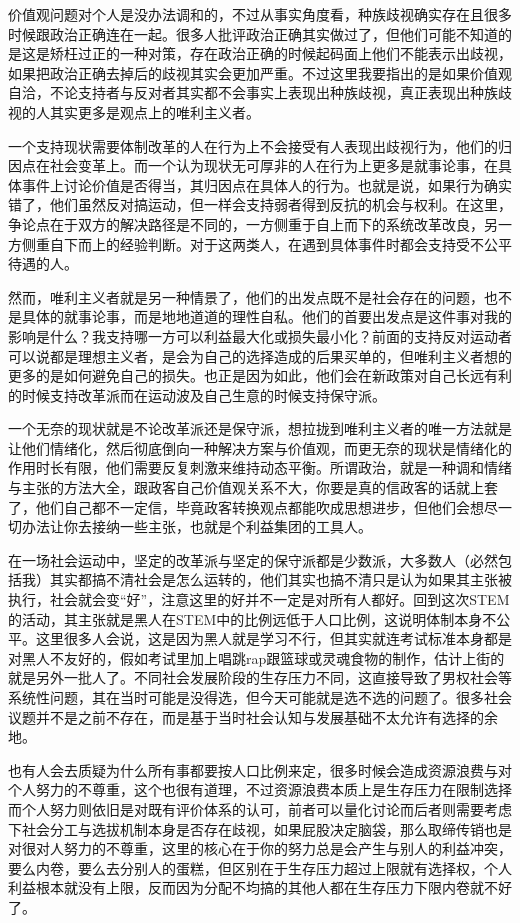 \documentclass[
]{book}
\begin{document}
价值观问题对个人是没办法调和的，不过从事实角度看，种族歧视确实存在且很多时候跟政治正确连在一起。很多人批评政治正确其实做过了，但他们可能不知道的是这是矫枉过正的一种对策，存在政治正确的时候起码面上他们不能表示出歧视，如果把政治正确去掉后的歧视其实会更加严重。不过这里我要指出的是如果价值观自洽，不论支持者与反对者其实都不会事实上表现出种族歧视，真正表现出种族歧视的人其实更多是观点上的唯利主义者。

一个支持现状需要体制改革的人在行为上不会接受有人表现出歧视行为，他们的归因点在社会变革上。而一个认为现状无可厚非的人在行为上更多是就事论事，在具体事件上讨论价值是否得当，其归因点在具体人的行为。也就是说，如果行为确实错了，他们虽然反对搞运动，但一样会支持弱者得到反抗的机会与权利。在这里，争论点在于双方的解决路径是不同的，一方侧重于自上而下的系统改革改良，另一方侧重自下而上的经验判断。对于这两类人，在遇到具体事件时都会支持受不公平待遇的人。

然而，唯利主义者就是另一种情景了，他们的出发点既不是社会存在的问题，也不是具体的就事论事，而是地地道道的理性自私。他们的首要出发点是这件事对我的影响是什么？我支持哪一方可以利益最大化或损失最小化？前面的支持反对运动者可以说都是理想主义者，是会为自己的选择造成的后果买单的，但唯利主义者想的更多的是如何避免自己的损失。也正是因为如此，他们会在新政策对自己长远有利的时候支持改革派而在运动波及自己生意的时候支持保守派。

一个无奈的现状就是不论改革派还是保守派，想拉拢到唯利主义者的唯一方法就是让他们情绪化，然后彻底倒向一种解决方案与价值观，而更无奈的现状是情绪化的作用时长有限，他们需要反复刺激来维持动态平衡。所谓政治，就是一种调和情绪与主张的方法大全，跟政客自己价值观关系不大，你要是真的信政客的话就上套了，他们自己都不一定信，毕竟政客转换观点都能吹成思想进步，但他们会想尽一切办法让你去接纳一些主张，也就是个利益集团的工具人。

在一场社会运动中，坚定的改革派与坚定的保守派都是少数派，大多数人（必然包括我）其实都搞不清社会是怎么运转的，他们其实也搞不清只是认为如果其主张被执行，社会就会变``好''，注意这里的好并不一定是对所有人都好。回到这次STEM的活动，其主张就是黑人在STEM中的比例远低于人口比例，这说明体制本身不公平。这里很多人会说，这是因为黑人就是学习不行，但其实就连考试标准本身都是对黑人不友好的，假如考试里加上唱跳rap跟篮球或灵魂食物的制作，估计上街的就是另外一批人了。不同社会发展阶段的生存压力不同，这直接导致了男权社会等系统性问题，其在当时可能是没得选，但今天可能就是选不选的问题了。很多社会议题并不是之前不存在，而是基于当时社会认知与发展基础不太允许有选择的余地。

也有人会去质疑为什么所有事都要按人口比例来定，很多时候会造成资源浪费与对个人努力的不尊重，这个也很有道理，不过资源浪费本质上是生存压力在限制选择而个人努力则依旧是对既有评价体系的认可，前者可以量化讨论而后者则需要考虑下社会分工与选拔机制本身是否存在歧视，如果屁股决定脑袋，那么取缔传销也是对很对人努力的不尊重，这里的核心在于你的努力总是会产生与别人的利益冲突，要么内卷，要么去分别人的蛋糕，但区别在于生存压力超过上限就有选择权，个人利益根本就没有上限，反而因为分配不均搞的其他人都在生存压力下限内卷就不好了。
\end{document}
